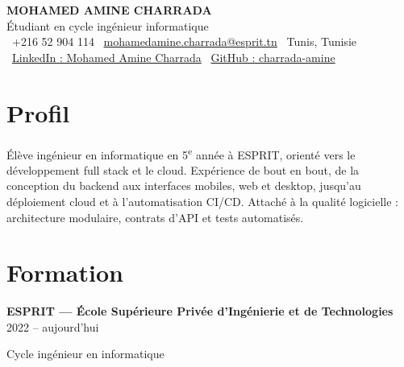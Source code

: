 \documentclass[10.5pt,a4paper]{article}
\newcommand{\entry}[2]{\noindent #1 \hfill #2\par}
\begin{document}
\begin{center}
  {\LARGE\bfseries MOHAMED AMINE CHARRADA}\\[4pt]
  Étudiant en cycle ingénieur informatique\\[3pt]
  \faPhone*\ +216 52 904 114 \quad
  \faEnvelope\ \href{mailto:mohamedamine.charrada@esprit.tn}{mohamedamine.charrada@esprit.tn} \quad
  \faMapMarker*\ Tunis, Tunisie\\
  \faLinkedin\ \href{https://www.linkedin.com/in/mohamed-amine-charrada-17a494315/}{LinkedIn : Mohamed Amine Charrada} \quad
  \faGithub\ \href{https://github.com/charrada-amine}{GitHub : charrada-amine}
\end{center}

\section*{Profil}
Élève ingénieur en informatique en 5\textsuperscript{e} année à ESPRIT, orienté vers le développement full stack
et le cloud. Expérience de bout en bout, de la conception du backend aux interfaces mobiles, web et desktop,
jusqu’au déploiement cloud et à l’automatisation CI/CD. Attaché à la qualité logicielle :
architecture modulaire, contrats d’API et tests automatisés.

\section*{Formation}
\entry{\textbf{ESPRIT — École Supérieure Privée d’Ingénierie et de Technologies}}{2022 – aujourd’hui}
Cycle ingénieur en informatique
\end{document}
